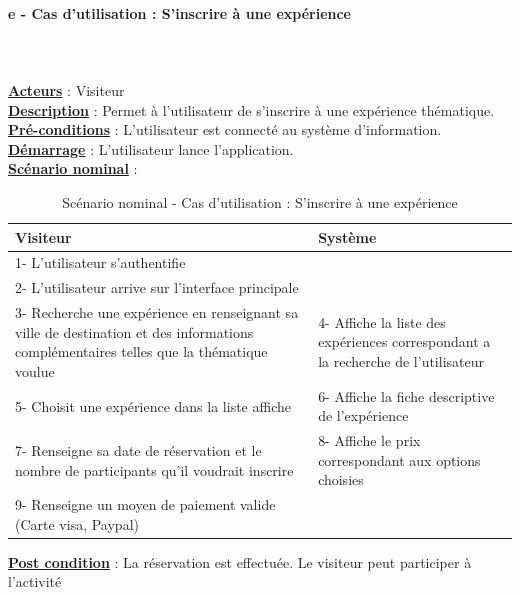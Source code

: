 \paragraph{e - Cas d'utilisation : S’inscrire à une expérience}
$ $\\$ $\\\underline{\textbf{Acteurs}} : Visiteur
\\\underline{\textbf{Description}} : Permet à l’utilisateur de s’inscrire à une expérience thématique.
\\\underline{\textbf{Pré-conditions}} : L'utilisateur est connecté au système d’information.
\\\underline{\textbf{Démarrage}} : L’utilisateur lance l’application.
\\\underline{\textbf{Scénario nominal}} :

\begin{table}[h]
\begin{center}
\begin{tabular}{|p{8cm}|p{8cm}|}
\hline
Visiteur & Système\\
\hline
1- L’utilisateur s’authentifie & $ $\\
\hline	
2- L’utilisateur arrive sur l’interface principale & $ $\\
\hline 	
3- Recherche une expérience en renseignant sa ville de destination et des informations complémentaires telles que la thématique voulue & 4- Affiche la liste des expériences correspondant a la recherche de l'utilisateur\\
\hline
5- Choisit une expérience dans la liste affiche & 6- Affiche la fiche descriptive de l'expérience\\
\hline
7- Renseigne sa date de réservation et le nombre de participants qu’il voudrait inscrire & 8- Affiche le prix correspondant aux options choisies\\
\hline
9- Renseigne un moyen de paiement valide (Carte visa, Paypal) & $ $\\
\hline
\end{tabular}
\caption{Scénario nominal - Cas d'utilisation : S’inscrire à une expérience}
\end{center}
\end{table}
\begin{flushleft}
\underline{\textbf{Post condition}} : La réservation est effectuée. Le visiteur peut participer à l'activité
\end{flushleft}

